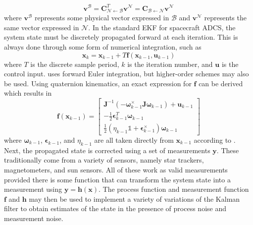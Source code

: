 \begin{equation}
    \bm{v}^{\mathcal{B}} = 
    \bm{C}_{\mathcal{N}\leftarrow\mathcal{B}}^T\bm{v}^{\mathcal{N}}
    =\bm{C}_{\mathcal{B}\leftarrow\mathcal{N}}\bm{v}^{\mathcal{N}}
\end{equation}
where $\bm{v}^{\mathcal{B}}$ represents some physical vector expressed in $\mathcal{B}$ and $\bm{v}^{\mathcal{N}}$ represents the same vector expressed in $\mathcal{N}$. In the standard EKF for spacecraft ADCS, the system state must be discretely propagated forward at each iteration. This is always done through some form of numerical integration, such as
\begin{equation}\label{equation:forward_euler}
    \bm{x}_{k} = \bm{x}_{k-1}+T\bm{f}(\bm{x}_{k-1},\bm{u}_{k-1})
\end{equation}
where $T$ is the discrete sample period, $k$ is the iteration number, and $\bm{u}$ is the control input.  uses forward Euler integration, but higher-order schemes may also be used. Using quaternion kinematics, an exact expression for $\bm{f}$ can be derived which results in
\begin{equation}
    \bm{f}(\bm{x}_{k-1})=
    \begin{bmatrix}
    
    \bm{J}^{-1}(-\bm{\omega}_{k-1}^{\times}\bm{J}\bm{\omega}_{k-1})+\bm{u}_{k-1} \\

    -\frac{1}{2}\bm{\epsilon}_{k-1}^T\bm{\omega}_{k-1} \\

    \frac{1}{2}(\eta_{k-1}\mathbb{1} +
    \bm{\epsilon}_{k-1}^{\times})\bm{\omega}_{k-1}

    \end{bmatrix}
\end{equation}
where $\bm{\omega}_{k-1}$, $\bm{\epsilon}_{k-1}$, and $\eta_{k-1}$ are all taken directly from $\bm{x}_{k-1}$ according to . Next, the propagated state is corrected using a set of measurements $\bm{y}$. These traditionally come from a variety of sensors, namely star trackers, magnetometers, and sun sensors. All of these work as valid measurements provided there is some function that can transform the system state into a measurement using $\bm{y} = \bm{h}(\bm{x})$. The process function and measurement function $\bm{f}$ and $\bm{h}$ may then be used to implement a variety of variations of the Kalman filter to obtain estimates of the state in the presence of process noise and measurement noise.



